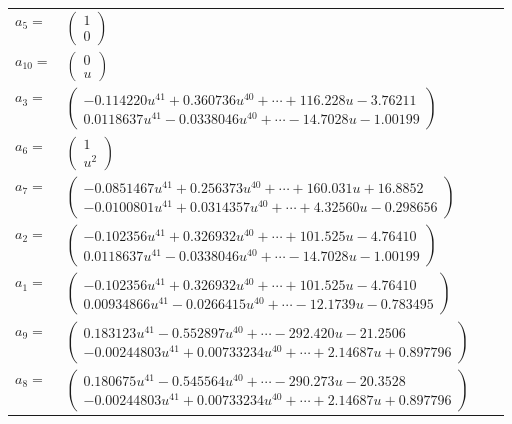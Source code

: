 \documentclass[1p]{elsarticle_modified}
\theoremstyle{definition}
\begin{document}
\begin{tabular}{m{7pt} m{180pt} m{7pt} m{180pt} }
\flushright $a_{5}=$&$\begin{pmatrix}1\\0\end{pmatrix}$ \\
\flushright $a_{10}=$&$\begin{pmatrix}0\\u\end{pmatrix}$ \\
\flushright $a_{3}=$&$\begin{pmatrix}-0.114220 u^{41}+0.360736 u^{40}+\cdots+116.228 u-3.76211\\0.0118637 u^{41}-0.0338046 u^{40}+\cdots-14.7028 u-1.00199\end{pmatrix}$ \\
\flushright $a_{6}=$&$\begin{pmatrix}1\\u^2\end{pmatrix}$ \\
\flushright $a_{7}=$&$\begin{pmatrix}-0.0851467 u^{41}+0.256373 u^{40}+\cdots+160.031 u+16.8852\\-0.0100801 u^{41}+0.0314357 u^{40}+\cdots+4.32560 u-0.298656\end{pmatrix}$ \\
\flushright $a_{2}=$&$\begin{pmatrix}-0.102356 u^{41}+0.326932 u^{40}+\cdots+101.525 u-4.76410\\0.0118637 u^{41}-0.0338046 u^{40}+\cdots-14.7028 u-1.00199\end{pmatrix}$ \\
\flushright $a_{1}=$&$\begin{pmatrix}-0.102356 u^{41}+0.326932 u^{40}+\cdots+101.525 u-4.76410\\0.00934866 u^{41}-0.0266415 u^{40}+\cdots-12.1739 u-0.783495\end{pmatrix}$ \\
\flushright $a_{9}=$&$\begin{pmatrix}0.183123 u^{41}-0.552897 u^{40}+\cdots-292.420 u-21.2506\\-0.00244803 u^{41}+0.00733234 u^{40}+\cdots+2.14687 u+0.897796\end{pmatrix}$ \\
\flushright $a_{8}=$&$\begin{pmatrix}0.180675 u^{41}-0.545564 u^{40}+\cdots-290.273 u-20.3528\\-0.00244803 u^{41}+0.00733234 u^{40}+\cdots+2.14687 u+0.897796\end{pmatrix}$ \\

\end{tabular}
\end{document}
